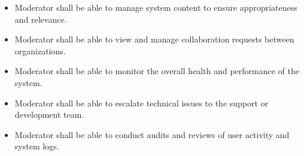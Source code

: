\begin{itemize}
    \item Moderator shall be able to manage system content to ensure appropriateness and relevance.
    \item Moderator shall be able to view and manage collaboration requests between organizations.
    \item Moderator shall be able to monitor the overall health and performance of the system.
    \item Moderator shall be able to escalate technical issues to the support or development team.
    \item Moderator shall be able to conduct audits and reviews of user activity and system logs.
    \\
    \\
    \\
    \\\\\\
    \\
    \\
    \\
    \\
    \\
    \\
    \\
\end{itemize}


\clearpage